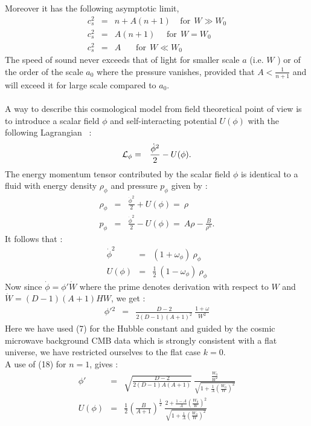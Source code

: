 \documentclass[a4paper,12pt,a4]{article}
\begin{document}
Moreover it has the following asymptotic limit, 
\begin{eqnarray}
c_s^2 & = & n + A ( n + 1)~~~~~\mbox{for}~~W \gg W_0  \nonumber \\
c_s^2 & = & A ( n +1 )~~~~~~\mbox{for}~~W = W_0  \nonumber \\
c_s^2 & = & A~~~~~~~~\mbox{for}~~W \ll W_0   
\end{eqnarray}  
The speed of sound never exceeds that of light for smaller scale $a$ 
(i.e. $W$ ) or of the order of the scale $a_0$ where the pressure 
vanishes, provided that $A < \frac{1}{n + 1}$ and will exceed it 
for large scale compared to $a_0$. \\  
~\\
A way to describe this cosmological model from field theoretical 
point of view is to introduce a scalar field $\phi$ and self-interacting 
potential $U(\phi)$ with the following Lagrangian~\cite{bar} : 
\begin{eqnarray}
{\cal L}_{\phi} & = & \frac{\dot{\phi}^2}{2} - U(\phi) . 
\end{eqnarray}
The energy momentum tensor contributed by the scalar field $\phi$ is 
identical to a fluid with energy density $\rho_{\phi}$ and pressure 
$p_{\phi}$ given by : 
\begin{eqnarray}
\rho_{\phi} & = & \frac{\dot{\phi}^2}{2} + U(\phi) =~ \rho  \nonumber \\
p_{\phi} & = & \frac{\dot{\phi}^2}{2} - U(\phi) =~ A \rho - \frac{B}{\rho^n} .
\end{eqnarray} 
It follows that : 
\begin{eqnarray}
\dot{\phi}^2 & = & ( 1 + \omega_{\phi} )~ \rho_{\phi}  \nonumber \\
U(\phi) & = & \frac{1}{2}~( 1 - \omega_{\phi} )~\rho_{\phi} 
\end{eqnarray}
Now since $\dot{\phi} = \phi' \dot{W}$ where the prime denotes derivation 
with respect to $W$ and $\dot{W} = (D -1) (A + 1) H W$, we get : 
\begin{eqnarray}
\phi'{^2} & = & \frac{D -2}{2 (D -1) (A+1)^2}~\frac{1 + \omega}{W^2} 
\end{eqnarray} 
Here we have used (7) for the Hubble constant and guided by the cosmic 
microwave background CMB data which is strongly consistent with a flat 
universe, we have restricted ourselves to the flat case $k = 0$. \\ 
A use of (18) for $n=1$, gives : 
\begin{eqnarray}
\phi' & = & \sqrt{\frac{D -2}{2 (D -1) A (A +1)}}~ 
\frac{\frac{W_0}{W^2}}{\sqrt{1 + \frac{1}{A} 
\left( \frac{W_0}{W} \right)^2}} \nonumber \\
U \left( \phi \right) & = & \frac{1}{2} 
\left(\frac{B}{A+1} \right)^{\frac{1}{2}}~ \frac{2 + \frac{1 -A}{A} 
\left( \frac{W_0}{W} \right)^2}{\sqrt{1 + \frac{1}{A} \left( 
\frac{W_0}{W} \right)^2}} 
\end{eqnarray}  
\end{document}
